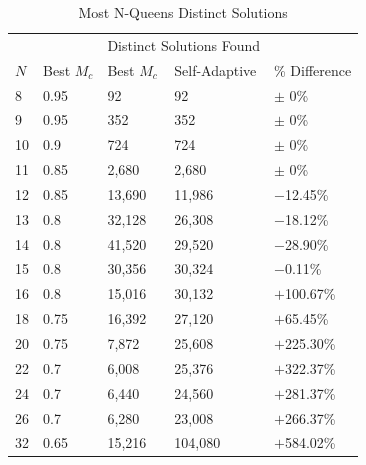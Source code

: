 \documentclass[conference]{IEEEtran}
\begin{document}
\begin{table}
\centering
\caption{Most N-Queens Distinct Solutions}
\begin{tabular}{|l|l|l|l|l|} \hline
&               &  \multicolumn{2}{c|}{Distinct Solutions Found}& \\ \cline{3-4}
$N$&  Best $M_{c}$&  Best $M_{c}$&    Self-Adaptive&    \% Difference\\ \hline
8&  0.95&          92&              92&                         $\pm$ 0\% \\ \hline                        
9&  0.95&          352&             352&                        $\pm$ 0\% \\ \hline
10& 0.9&           724&             724&                        $\pm$ 0\% \\ \hline
11& 0.85&          2,680&           2,680&                      $\pm$ 0\% \\ \hline
12& 0.85&          13,690&          11,986&                     $-$12.45\% \\ \hline
13& 0.8&           32,128&          26,308&                     $-$18.12\% \\ \hline
14& 0.8&           41,520&          29,520&                     $-$28.90\% \\ \hline
15& 0.8&           30,356&          30,324&                     $-$0.11\% \\ \hline
16& 0.8&           15,016&          30,132&                     $+$100.67\% \\ \hline
18& 0.75&          16,392&          27,120&                     $+$65.45\% \\ \hline
20& 0.75&          7,872&           25,608&                     $+$225.30\% \\ \hline
22& 0.7&           6,008&           25,376&                     $+$322.37\% \\ \hline
24& 0.7&           6,440&           24,560&                     $+$281.37\% \\ \hline
26& 0.7&           6,280&           23,008&                     $+$266.37\% \\ \hline
32& 0.65&          15,216&          104,080&                    $+$584.02\% \\ \hline
\end{tabular}
\label{table:distinctsol}
\end{table}
\end{document}
